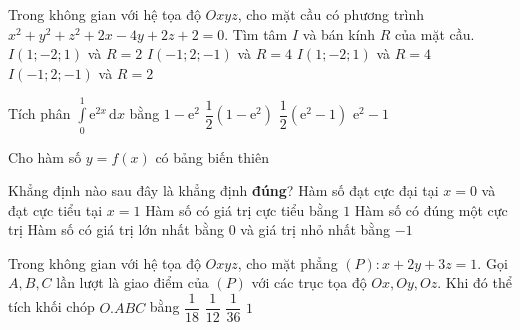 \begin{ex}%
	Trong không gian với hệ tọa độ $Oxyz$, cho mặt cầu có phương trình $x^2+y^2+z^2+2x-4y+2z+2=0$. Tìm tâm $I$ và bán kính $R$ của mặt cầu.
	\choice
	{$I(1;-2;1)$ và $R=2$}
	{$I(-1;2;-1)$ và $R=4$}
	{$I(1;-2;1)$ và $R=4$}
	{\True $I(-1;2;-1)$ và $R=2$}
\end{ex} 

\begin{ex}%
	Tích phân $\displaystyle\int\limits_0^1 \mathrm{e}^{2x}\mathrm{\,d}x$ bằng
	\choice
	{$1-\mathrm{e}^2$}
	{$\dfrac{1}{2}(1-\mathrm{e}^2)$}
	{\True $\dfrac{1}{2}(\mathrm{e}^2-1)$}
	{$\mathrm{e}^2-1$}
\end{ex}

\begin{ex}%
	Cho hàm số $y=f(x)$ có bảng biến thiên
	\begin{center}
	\end{center}
	 Khẳng định nào sau đây là khẳng định \textbf{đúng}?
	\choice
	{\True Hàm số đạt cực đại tại $x=0$ và đạt cực tiểu tại $x=1$}
	{Hàm số có giá trị cực tiểu bằng $1$}
	{Hàm số có đúng một cực trị}
	{Hàm số có giá trị lớn nhất bằng $0$ và giá trị nhỏ nhất bằng $-1$}
\end{ex}

\begin{ex}%
	Trong không gian với hệ tọa độ $Oxyz$, cho mặt phẳng $(P)\colon x+2y+3z=1.$ Gọi $A,B,C$ lần lượt là giao điểm của $(P)$ với các trục tọa độ $Ox,Oy,Oz$. Khi đó thể tích khối chóp $O.ABC$ bằng
	\choice
	{$\dfrac{1}{18}$}
	{$\dfrac{1}{12}$}
	{\True $\dfrac{1}{36}$}
	{$1$}
\end{ex}

